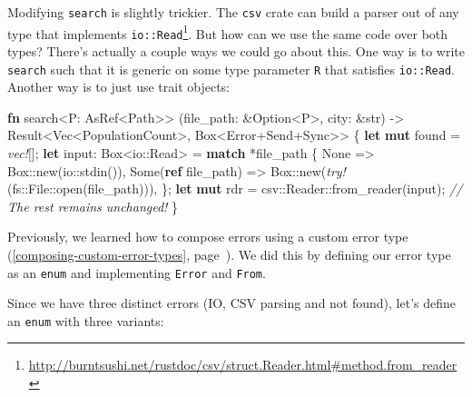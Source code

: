 \documentclass[a4paper,]{book}
\renewcommand*{\hyperref}[2][\ar]{%
  \def\ar{#2}%
  #2 (\autoref{#1}, page~\pageref{#1})}
\newenvironment{Shaded}{\begin{snugshade}}{\end{snugshade}}
\newcommand{\KeywordTok}[1]{\textcolor[rgb]{0.13,0.29,0.53}{\textbf{{#1}}}}
\newcommand{\DataTypeTok}[1]{\textcolor[rgb]{0.13,0.29,0.53}{{#1}}}
\newcommand{\ConstantTok}[1]{\textcolor[rgb]{0.00,0.00,0.00}{{#1}}}
\newcommand{\CommentTok}[1]{\textcolor[rgb]{0.56,0.35,0.01}{\textit{{#1}}}}
\newcommand{\BuiltInTok}[1]{{#1}}
\newcommand{\PreprocessorTok}[1]{\textcolor[rgb]{0.56,0.35,0.01}{\textit{{#1}}}}
\newcommand{\NormalTok}[1]{{#1}}
\renewcommand{\href}[2]{#2\footnote{\url{#1}}}
\begin{document}
Modifying \texttt{search} is slightly trickier. The \texttt{csv} crate
can build a parser out of
\href{http://burntsushi.net/rustdoc/csv/struct.Reader.html\#method.from_reader}{any
type that implements \texttt{io::Read}}. But how can we use the same
code over both types? There's actually a couple ways we could go about
this. One way is to write \texttt{search} such that it is generic on
some type parameter \texttt{R} that satisfies \texttt{io::Read}. Another
way is to just use trait objects:

\begin{Shaded}
\begin{Highlighting}[]
\KeywordTok{fn} \NormalTok{search<P: AsRef<Path>>}
         \NormalTok{(file_path: &}\DataTypeTok{Option}\NormalTok{<P>, city: &}\DataTypeTok{str}\NormalTok{)}
         \NormalTok{-> }\DataTypeTok{Result}\NormalTok{<}\DataTypeTok{Vec}\NormalTok{<PopulationCount>, }\DataTypeTok{Box}\NormalTok{<Error+}\BuiltInTok{Send}\NormalTok{+}\BuiltInTok{Sync}\NormalTok{>> \{}
    \KeywordTok{let} \KeywordTok{mut} \NormalTok{found = }\PreprocessorTok{vec!}\NormalTok{[];}
    \KeywordTok{let} \NormalTok{input: }\DataTypeTok{Box}\NormalTok{<io::Read> = }\KeywordTok{match} \NormalTok{*file_path \{}
        \ConstantTok{None} \NormalTok{=> }\DataTypeTok{Box}\NormalTok{::new(io::stdin()),}
        \ConstantTok{Some}\NormalTok{(}\KeywordTok{ref} \NormalTok{file_path) => }\DataTypeTok{Box}\NormalTok{::new(}\PreprocessorTok{try!}\NormalTok{(fs::File::open(file_path))),}
    \NormalTok{\};}
    \KeywordTok{let} \KeywordTok{mut} \NormalTok{rdr = csv::Reader::from_reader(input);}
    \CommentTok{// The rest remains unchanged!}
\NormalTok{\}}
\end{Highlighting}
\end{Shaded}


Previously, we learned how to
\hyperref[composing-custom-error-types]{compose errors using a custom
error type}. We did this by defining our error type as an \texttt{enum}
and implementing \texttt{Error} and \texttt{From}.

Since we have three distinct errors (IO, CSV parsing and not found),
let's define an \texttt{enum} with three variants:
\end{document}
